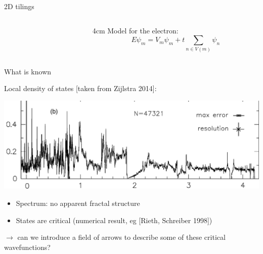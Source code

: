 \documentclass[xcolor=x11names,compress,professionalfonts, aspectratio=169]{beamer}
\renewcommand{\(}{\begin{columns}}
\renewcommand{\)}{\end{columns}}
\newcommand{\<}[1]{\begin{column}{#1}}
\renewcommand{\>}{\end{column}}
\begin{document}
\begin{frame}{2D tilings}
\begin{columns}
\begin{column}{5cm}
{}
\end{column}
\<{4cm}
Model for the electron:
\[
	E \psi_m = V_m \psi_m + t\sum_{n \in V(m)} \psi_n
\]
\>
\end{columns}

\end{frame}

\begin{frame}{What is known}

Local density of states [taken from Zijlstra 2014]:

{\centering
\includegraphics[scale=.1]{img/idos_AB_small.png}

}
\begin{itemize}
	\item Spectrum: no apparent fractal structure
	\item States are critical (numerical result, eg [Rieth, Schreiber 1998])
\end{itemize}
$\rightarrow$ can we introduce a field of arrows to describe some of these critical wavefunctions?
\end{frame}
\end{document}
